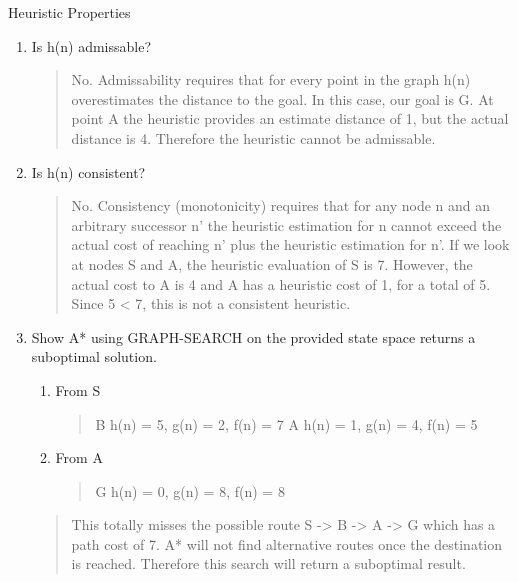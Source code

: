 \documentclass[11pt]{article}
\newenvironment{problem}[2][Problem]{\begin{trivlist}
\item[\hskip \labelsep {\bfseries #1}\hskip \labelsep {\bfseries #2.}]}{\end{trivlist}}
\begin{document}
\begin{problem}{3}
Heuristic Properties
\begin{enumerate}
	\item Is h(n) admissable?
	\begin{verse}
		No. Admissability requires that for every point in the graph h(n) overestimates the distance to the goal. In this case, our goal is G. At point A the heuristic provides an estimate distance of 1, but the actual distance is 4. Therefore the heuristic cannot be admissable.
	\end{verse}
	\item Is h(n) consistent?
	\begin{verse}
		No. Consistency (monotonicity) requires that for any node n and an arbitrary successor n' the heuristic estimation for n cannot exceed the actual cost of reaching n' plus the heuristic estimation for n'. If we look at nodes S and A, the heuristic evaluation of S is 7. However, the actual cost to A is 4 and A has a heuristic cost of 1, for a total of 5. Since 5 < 7, this is not a consistent heuristic.
	\end{verse}
	\item Show A* using GRAPH-SEARCH on the provided state space returns a suboptimal solution.
	\begin{enumerate}[label={Phase \Roman*},leftmargin=1.25in]
		\item [Phase 1] From S
			\begin{verse}
				B h(n) = 5, g(n) = 2, f(n) = 7
				A h(n) = 1, g(n) = 4, f(n) = 5
			\end{verse}
		\item [Phase 2] From A
			\begin{verse}
				G h(n) = 0, g(n) = 8, f(n) = 8
			\end{verse}
	\end{enumerate}
	\begin{verse}
		This totally misses the possible route S -> B -> A -> G which has a path cost of 7. A* will not find alternative routes once the destination is reached. Therefore this search will return a suboptimal result.
	\end{verse}
\end{enumerate}
\end{problem}
\end{document}
